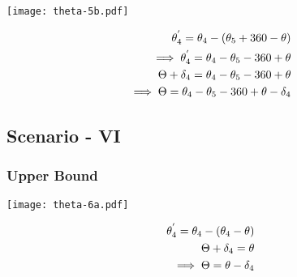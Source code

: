 \begin{minipage}[t]{0.5\textwidth}
\texttt{[image: theta-5b.pdf]} 
\end{minipage}
\begin{minipage}[t]{0.5\textwidth}
\vspace{-1in}
\begin{equation*}
\centering
\begin{aligned}
\theta_4^{'} = \theta_4 - (\theta_5 + 360 -\theta)\\
\implies \theta_4^{'} = \theta_4 - \theta_5 - 360 + \theta \\
\Theta + \delta_4 = \theta_4 - \theta_5 - 360 + \theta \\
\implies \Theta = \theta_4 - \theta_5 - 360 + \theta - \delta_4 
\end{aligned}
\end{equation*}
\end{minipage}








\subsection{Scenario - VI}

\subsubsection{Upper Bound}

\begin{minipage}[t]{0.5\textwidth}
\texttt{[image: theta-6a.pdf]}  
\end{minipage}
\begin{minipage}[t]{0.5\textwidth}
\vspace{-1in}
\begin{equation*}
\centering
\begin{aligned}
\theta_4^{'} = \theta_4 - (\theta_4 - \theta)\\
\Theta + \delta_4 = \theta \\
\implies \Theta = \theta - \delta_4
\end{aligned}
\end{equation*}
\end{minipage}








